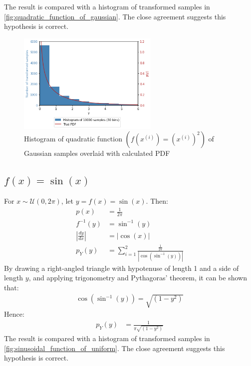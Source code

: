 \documentclass[a4paper]{article}
\begin{document}
The result is compared with a histogram of transformed samples in \autoref{fig:quadratic_function_of_gaussian}. The
close agreement suggests this hypothesis is correct.

\begin{figure}[h]
    \centering
    \includegraphics[width=0.6\textwidth]{figures/quadratic_function_of_gaussian.png}
    \caption{Histogram of quadratic function $\left(f(x^{(i)}) = \left(x^{(i)}\right)^2\right)$ of Gaussian samples
    overlaid with calculated PDF}
    \label{fig:quadratic_function_of_gaussian}
\end{figure}


\subsection{$f(x) = \sin(x)$}
For $x \sim \mathcal{U}(0, 2\pi)$, let $y = f(x) = \sin(x)$. Then:
\begin{align*}
    p(x) &= \frac{1}{2\pi} \\
    f^{-1}(y) &= \sin^{-1}(y) \\
    \left|\frac{dy}{dx}\right| &= |\cos(x)| \\
    p_Y(y) &= \sum_{i=1}^{2} \frac{\frac{1}{2\pi}}{\left| \cos\left(\sin^{-1}(y)\right) \right|}
\end{align*}
By drawing a right-angled triangle with hypotenuse of length 1 and a side of length $y$, and applying trigonometry and
Pythagoras' theorem, it can be shown that:
\begin{align*}
    \cos\left(\sin^{-1}(y)\right) = \sqrt{\left(1 -y^2 \right)}
\end{align*}
Hence:
\begin{align*}
    p_Y(y) &= \frac{1}{\pi \sqrt{\left(1- y^2\right)}}
\end{align*}
The result is compared with a histogram of transformed samples in \autoref{fig:sinusoidal_function_of_uniform}. The
close agreement suggests this hypothesis is correct.
\end{document}
